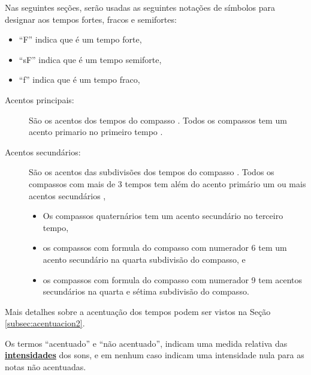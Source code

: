 \begin{notation}[]
Nas seguintes seções,
serão usadas as seguintes notações de símbolos para designar aos tempos fortes, fracos e semifortes:
\begin{itemize}
\item ``F''  indica que é um tempo forte, 
\item ``sF'' indica que é um tempo semiforte, 
\item ``f''  indica que é um tempo fraco,
\end{itemize}
\end{notation}


\begin{description}
\item[Acentos principais:] \label{def:acentoprincipal} 
São os acentos dos tempos do compasso  \cite[pp. 142]{medteoria}.
Todos os compassos tem um acento primario no primeiro tempo \cite[pp. 24]{crowther2003usted}.
\item[Acentos secundários:] \label{def:acentosecundario} 
São os acentos das subdivisões dos tempos do compasso \cite[pp. 142]{medteoria}.
Todos os compassos com mais de 3 tempos tem além do acento primário um ou mais acentos secundários \cite[pp. 25]{crowther2003usted},
\begin{itemize}
\item Os compassos quaternários tem um acento secundário no terceiro tempo,
\item os compassos com formula do compasso com numerador 6  tem um acento secundário na quarta subdivisão do compasso, e
\item os compassos com formula do compasso com numerador 9  tem    acentos secundários na quarta e sétima subdivisão do compasso.
\end{itemize} 
\end{description}

Mais detalhes sobre a acentuação dos tempos podem ser vistos na Seção \ref{subsec:acentuacion2}.

\begin{tcbattention}
Os termos ``acentuado'' e ``não acentuado'', 
indicam uma medida relativa das \hyperref[sec:pos:Intensidade]{\textbf{intensidades}} dos sons, 
e em nenhum caso indicam uma intensidade nula para as notas não acentuadas. 
\end{tcbattention}


